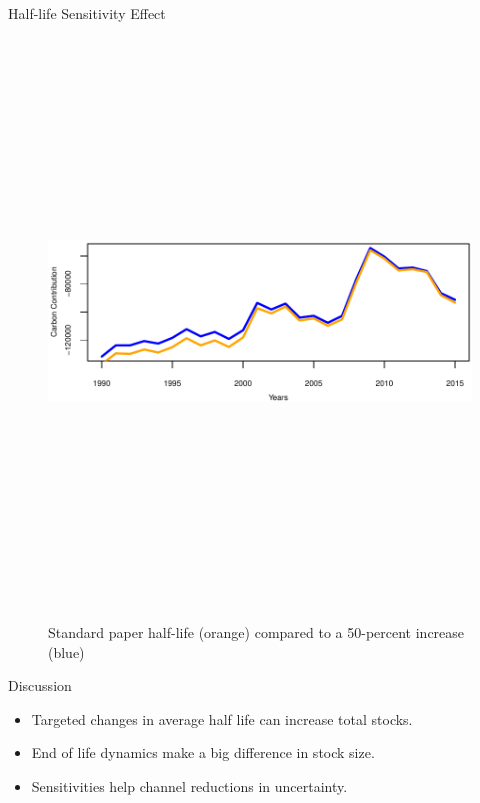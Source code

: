 \documentclass[final]{beamer}\usepackage[]{graphicx}\usepackage[]{color}
\newlength{\onecolwid}
\begin{document}
\begin{frame}[t]
\begin{columns}[t]
\begin{column}{\onecolwid}
\begin{block}{Half-life Sensitivity Effect}
\begin{center}
\begin{figure}
    {\includegraphics[width=1\linewidth, height = 15cm]{CopyOfTSPlot.pdf}}
    \caption{Standard paper half-life (orange) compared to a 50-percent increase (blue)}
\end{figure}
\end{center}
\end{block}




\begin{block}{Discussion}

\begin{itemize}
\item Targeted changes in average half life can increase total stocks.
\item End of life dynamics make a big difference in stock size.
\item Sensitivities help channel reductions in uncertainty.
\end{itemize}


\end{block}
\end{column}
\end{columns}
\end{frame}
\end{document}
